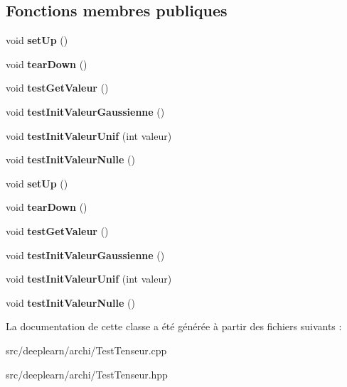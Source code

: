 \subsection*{Fonctions membres publiques}
\begin{DoxyCompactItemize}
\item 
\mbox{\label{classTestTenseur_a52db9b85a9aea7ae91c5f4d6f7ca2615}} 
void {\bfseries set\+Up} ()
\item 
\mbox{\label{classTestTenseur_afd5cb5d1ff64bc398e8d18ac9eaa00c9}} 
void {\bfseries tear\+Down} ()
\item 
\mbox{\label{classTestTenseur_a8bf3e16120293a440787b7094894fd6e}} 
void {\bfseries test\+Get\+Valeur} ()
\item 
\mbox{\label{classTestTenseur_a771d6bd087d586718600b270bd9c51f0}} 
void {\bfseries test\+Init\+Valeur\+Gaussienne} ()
\item 
\mbox{\label{classTestTenseur_a8daa25d92350bec7717fb97cd8c4868c}} 
void {\bfseries test\+Init\+Valeur\+Unif} (int valeur)
\item 
\mbox{\label{classTestTenseur_a9ed1780c80804210fb84e7d2f3213d05}} 
void {\bfseries test\+Init\+Valeur\+Nulle} ()
\item 
\mbox{\label{classTestTenseur_a52db9b85a9aea7ae91c5f4d6f7ca2615}} 
void {\bfseries set\+Up} ()
\item 
\mbox{\label{classTestTenseur_afd5cb5d1ff64bc398e8d18ac9eaa00c9}} 
void {\bfseries tear\+Down} ()
\item 
\mbox{\label{classTestTenseur_a8bf3e16120293a440787b7094894fd6e}} 
void {\bfseries test\+Get\+Valeur} ()
\item 
\mbox{\label{classTestTenseur_a771d6bd087d586718600b270bd9c51f0}} 
void {\bfseries test\+Init\+Valeur\+Gaussienne} ()
\item 
\mbox{\label{classTestTenseur_a8daa25d92350bec7717fb97cd8c4868c}} 
void {\bfseries test\+Init\+Valeur\+Unif} (int valeur)
\item 
\mbox{\label{classTestTenseur_a9ed1780c80804210fb84e7d2f3213d05}} 
void {\bfseries test\+Init\+Valeur\+Nulle} ()
\end{DoxyCompactItemize}


La documentation de cette classe a été générée à partir des fichiers suivants \+:\begin{DoxyCompactItemize}
\item 
src/deeplearn/archi/Test\+Tenseur.\+cpp\item 
src/deeplearn/archi/Test\+Tenseur.\+hpp\end{DoxyCompactItemize}
